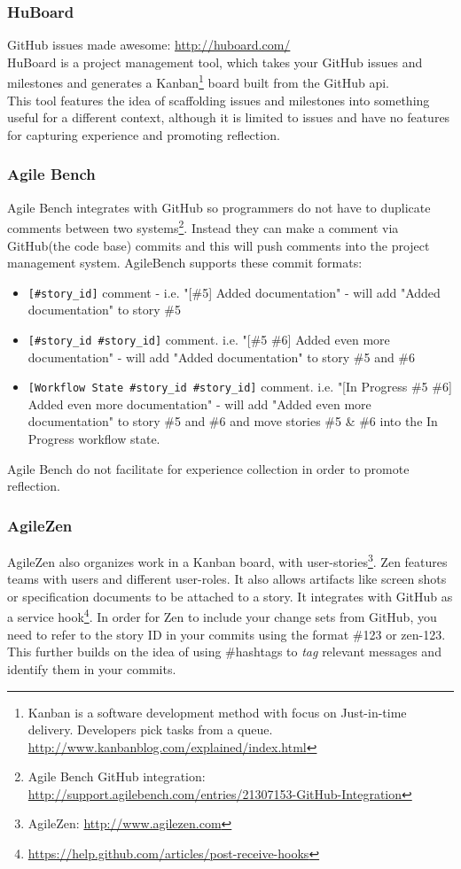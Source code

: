 \subsubsection*{HuBoard}
GitHub issues made awesome: \url{http://huboard.com/} \\
HuBoard is a project management tool, which takes your GitHub issues and milestones and generates a Kanban\footnote{Kanban is a software development method with focus on Just-in-time delivery. Developers pick tasks from a queue. \url{http://www.kanbanblog.com/explained/index.html}} board built from the GitHub api. \\
This tool features the idea of scaffolding issues and milestones into something useful for a different context, although it is limited to issues and have no features for capturing experience and promoting reflection. 
\subsubsection*{Agile Bench}
Agile Bench integrates with GitHub so programmers do not have to duplicate comments between two systems\footnote{Agile Bench GitHub integration: \url{http://support.agilebench.com/entries/21307153-GitHub-Integration}}. Instead they can make a comment via GitHub(the code base) commits and this will push comments into the project management system. AgileBench supports these commit formats:
\begin{itemize}
\item \verb|[#story_id]| comment - i.e. "[\#5] Added documentation" - will add "Added documentation" to story \#5
\item \verb|[#story_id #story_id]| comment. i.e. "[\#5 \#6] Added even more documentation" - will add "Added documentation" to story \#5 and \#6
\item \verb|[Workflow State #story_id #story_id]| comment. i.e. "[In Progress \#5 \#6] Added even more documentation" - will add "Added even more documentation" to story \#5 and \#6 and move stories \#5 \& \#6 into the In Progress workflow state.
\end{itemize}
Agile Bench do not facilitate for experience collection in order to promote reflection.
\subsubsection*{AgileZen}
AgileZen also organizes work in a Kanban board, with user-stories\footnote{AgileZen: \url{http://www.agilezen.com}}. Zen features teams with users and different user-roles. It also allows artifacts like screen shots or specification documents to be attached to a story. It integrates with GitHub as a service hook\footnote{\url{https://help.github.com/articles/post-receive-hooks}}. In order for Zen to include your change sets from GitHub, you need to refer to the story ID in your commits using the format \#123 or zen-123. This further builds on the idea of using \#hashtags to \textit{tag} relevant messages and identify them in your commits. 

